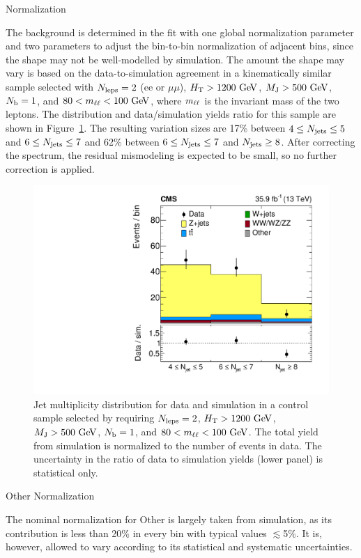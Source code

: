 \begin{section}{\Wjets Normalization}
\label{sec:wjets_normalization}

The \Wjets background is determined in the fit with one global normalization parameter and two parameters to adjust the bin-to-bin normalization of adjacent \Njets bins, since the \Njets shape may not be well-modelled by simulation.
The amount the \Njets shape may vary is based on the data-to-simulation agreement in a kinematically similar \Zjets sample selected with $N_{\mathrm{leps}} = 2$ ($\mathrm{ee}$ or $\mu\mu$), $H_{\mathrm{T}} > 1200~\mathrm{Ge\kern -0.1em V}$, $M_{\mathrm{J}} > 500~\mathrm{Ge\kern -0.1em V}$, $N_{\mathrm{b}} = 1$, and $80 < m_{\ell\ell} < 100~\mathrm{Ge\kern -0.1em V}$, where $m_{\ell\ell}$ is the invariant mass of the two leptons.
The \Njets distribution and data/simulation yields ratio for this sample are shown in Figure~\ref{fig:njets_dy}.
The resulting variation sizes are 17\% between $4 \leq N_{\mathrm{jets}} \leq 5$ and $6 \leq N_{\mathrm{jets}} \leq 7$ and 62\% between $6 \le N_{\mathrm{jets}} \le 7$ and $N_{\mathrm{jets}} \ge8$.
After correcting the \Njets spectrum, the residual \MJ mismodeling is expected to be small, so no further correction is applied.

\begin{figure}[tbp!]
\centering
\includegraphics[angle=0,width=0.60\columnwidth]{fig/njets_dy.pdf}
\caption{Jet multiplicity distribution for data and simulation in a \Zjets control sample selected by requiring $N_{\mathrm{leps}} = 2$, $H_{\mathrm{T}} > 1200~\mathrm{Ge\kern -0.1em V}$, $M_{\mathrm{J}} > 500~\mathrm{Ge\kern -0.1em V}$, $N_{\mathrm{b}} = 1$, and $80 < m_{\ell\ell} < 100~\mathrm{Ge\kern -0.1em V}$.
The total yield from simulation is normalized to the number of events in data.
The uncertainty in the ratio of data to simulation yields (lower panel) is statistical only.}
\label{fig:njets_dy}
\end{figure}

\end{section}

\begin{section}{Other Normalization}

The nominal normalization for Other is largely taken from simulation, as its contribution is less than 20\% in every bin with typical values $\lesssim$5\%.
It is, however, allowed to vary according to its statistical and systematic uncertainties.

\end{section}
